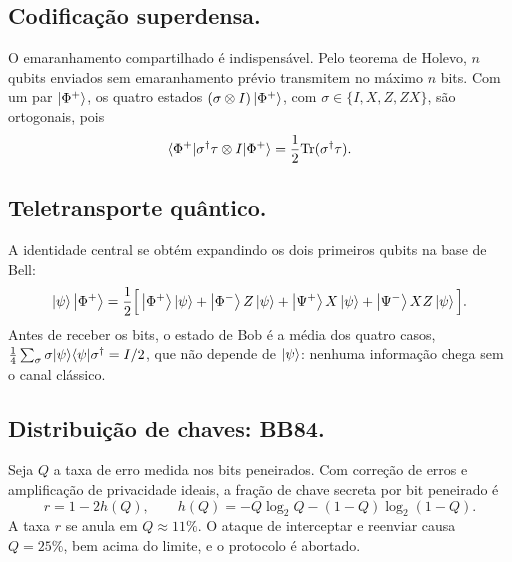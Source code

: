 \subsection{Codificação superdensa.}
O emaranhamento compartilhado é indispensável. Pelo teorema de Holevo, $n$ qubits enviados sem emaranhamento prévio transmitem no máximo $n$ bits. Com um par $\left|{\Phi^+}\right>$, os quatro estados $(\sigma\otimes I)\left|{\Phi^+}\right>$, com $\sigma\in\{I,X,Z,ZX\}$, são ortogonais, pois
\begin{equation}
    \langle{\Phi^+}|{\sigma^\dagger\tau\otimes I}|{\Phi^+}\rangle = \frac12\mathrm{Tr}(\sigma^\dagger\tau).
\end{equation}

\subsection{Teletransporte quântico.}
A identidade central se obtém expandindo os dois primeiros qubits na base de Bell:
\begin{equation}
    \left|{\psi}\right>\left|{\Phi^+}\right> = \frac12\Big[\left|{\Phi^+}\right>\left|{\psi}\right> + \left|{\Phi^-}\right>Z\left|{\psi}\right> + \left|{\Psi^+}\right>X\left|{\psi}\right> + \left|{\Psi^-}\right>XZ\left|{\psi}\right>\Big].
\end{equation}
Antes de receber os bits, o estado de Bob é a média dos quatro casos, $\frac14\sum_\sigma \sigma|{\psi}\rangle\langle{\psi}|\sigma^\dagger = I/2$, que não depende de $\left|{\psi}\right>$: nenhuma informação chega sem o canal clássico.

\subsection{Distribuição de chaves: BB84.}
Seja $Q$ a taxa de erro medida nos bits peneirados. Com correção de erros e amplificação de privacidade ideais, a fração de chave secreta por bit peneirado é
\begin{equation}
    r = 1 - 2h(Q), \qquad h(Q) = -Q\log_2 Q - (1-Q)\log_2(1-Q).
\end{equation}
A taxa $r$ se anula em $Q \approx 11\%$. O ataque de interceptar e reenviar causa $Q=25\%$, bem acima do limite, e o protocolo é abortado.
